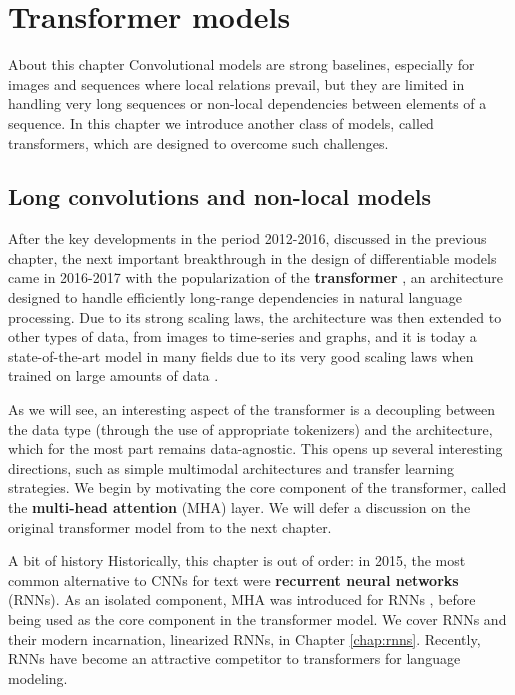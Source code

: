 \chapter{Transformer models}
\label{chap:transformers}

\begin{supportbox}{About this chapter}
Convolutional models are strong baselines, especially for images and sequences where local relations prevail, but they are limited in handling very long sequences or non-local dependencies between elements of a sequence. In this chapter we introduce another class of models, called transformers, which are designed to overcome such challenges.
\end{supportbox}

\section{Long convolutions and non-local models}

After the key developments in the period 2012-2016, discussed in the previous chapter, the next important breakthrough in the design of differentiable models came in 2016-2017 with the popularization of the \textbf{transformer} \cite{vaswani2017attention}, an architecture designed to handle efficiently long-range dependencies in natural language processing. Due to its strong scaling laws, the architecture was then extended to other types of data, from images to time-series and graphs, and it is today a state-of-the-art model in many fields due to its very good scaling laws when trained on large amounts of data \cite{kaplan2020scaling,bordes2024introduction}. 

As we will see, an interesting aspect of the transformer is a decoupling between the data type (through the use of appropriate tokenizers) and the architecture, which for the most part remains data-agnostic. This opens up several interesting directions, such as simple multimodal architectures and transfer learning strategies. We begin by motivating the core component of the transformer, called the \textbf{multi-head attention} (MHA) layer. We will defer a discussion on the original transformer model from \cite{vaswani2017attention} to the next chapter.


\begin{supportbox}{A bit of history}
Historically, this chapter is out of order: in 2015, the most common alternative to CNNs for text were \textbf{recurrent neural networks} (RNNs). As an isolated component, MHA was introduced for RNNs \cite{bahdanau2014neural}, before being used as the core component in the transformer model. We cover RNNs and their modern incarnation, linearized RNNs, in Chapter \ref{chap:rnns}. Recently, RNNs have become an attractive competitor to transformers for language modeling.
\end{supportbox}

